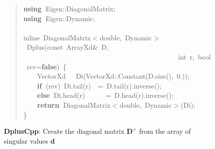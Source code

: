 \documentclass[shortnames,article]{jss}
\newcommand{\hlstd}[1]{\textcolor[rgb]{0,0,0}{#1}}
\newcommand{\hlnum}[1]{\textcolor[rgb]{0,0,0}{#1}}
\newcommand{\hlopt}[1]{\textcolor[rgb]{0,0,0}{#1}}
\newcommand{\hlkwa}[1]{\textcolor[rgb]{0.61,0.13,0.93}{\bf{#1}}}
\newcommand{\hlkwb}[1]{\textcolor[rgb]{0.13,0.54,0.13}{#1}}
\newcommand{\hlkwc}[1]{\textcolor[rgb]{0,0,1}{#1}}
\newcommand{\hlkwd}[1]{\textcolor[rgb]{0,0,0}{#1}}
\begin{document}
\begin{figure}[htb]
  \begin{quote}
    \noindent
    \ttfamily
    \hlstd{}\hlkwa{using\ }\hlstd{Eigen}\hlopt{::}\hlstd{DiagonalMatrix}\hlopt{;}\hspace*{\fill}\\
    \hlstd{}\hlkwa{using\ }\hlstd{Eigen}\hlopt{::}\hlstd{Dynamic}\hlopt{;}\hspace*{\fill}\\
    \hlstd{}\hspace*{\fill}\\
    \hlkwc{inline\ }\hlstd{DiagonalMatrix}\hlopt{$<$}\hlstd{}\hlkwb{double}\hlstd{}\hlopt{,\ }\hlstd{Dynamic}\hlopt{$>$\ }\hlstd{}\hlkwd{Dplus}\hlstd{}\hlopt{(}\hlstd{}\hlkwb{const\ }\hlstd{ArrayXd}\hlopt{\&\ }\hlstd{D}\hlopt{,}\hspace*{\fill}\\
    \hlstd{}\hlstd{\ \ \ \ \ \ \ \ \ \ \ \ \ \ \ \ \ \ \ \ \ \ \ \ \ \ \ \ \ \ \ \ \ \ \ \ \ \ \ \ \ \ \ \ \ }\hlstd{}\hlkwb{int\ }\hlstd{r}\hlopt{,\ }\hlstd{}\hlkwb{bool\ }\hlstd{rev}\hlopt{=}\hlstd{}\hlkwa{false}\hlstd{}\hlopt{)\ \{}\hspace*{\fill}\\
    \hlstd{}\hlstd{\ \ \ \ }\hlstd{VectorXd}\hlstd{\ \ \ }\hlstd{}\hlkwd{Di}\hlstd{}\hlopt{(}\hlstd{VectorXd}\hlopt{::}\hlstd{}\hlkwd{Constant}\hlstd{}\hlopt{(}\hlstd{D}\hlopt{.}\hlstd{}\hlkwd{size}\hlstd{}\hlopt{(),\ }\hlstd{}\hlnum{0}\hlstd{}\hlopt{.));}\hspace*{\fill}\\
    \hlstd{}\hlstd{\ \ \ \ }\hlstd{}\hlkwa{if\ }\hlstd{}\hlopt{(}\hlstd{rev}\hlopt{)\ }\hlstd{Di}\hlopt{.}\hlstd{}\hlkwd{tail}\hlstd{}\hlopt{(}\hlstd{r}\hlopt{)}\hlstd{\ \ }\hlopt{=\ }\hlstd{D}\hlopt{.}\hlstd{}\hlkwd{tail}\hlstd{}\hlopt{(}\hlstd{r}\hlopt{).}\hlstd{}\hlkwd{inverse}\hlstd{}\hlopt{();}\hspace*{\fill}\\
    \hlstd{}\hlstd{\ \ \ \ }\hlstd{}\hlkwa{else\ }\hlstd{Di}\hlopt{.}\hlstd{}\hlkwd{head}\hlstd{}\hlopt{(}\hlstd{r}\hlopt{)}\hlstd{\ \ \ \ \ \ }\hlopt{=\ }\hlstd{D}\hlopt{.}\hlstd{}\hlkwd{head}\hlstd{}\hlopt{(}\hlstd{r}\hlopt{).}\hlstd{}\hlkwd{inverse}\hlstd{}\hlopt{();}\hspace*{\fill}\\
    \hlstd{}\hlstd{\ \ \ \ }\hlstd{}\hlkwa{return\ }\hlstd{DiagonalMatrix}\hlopt{$<$}\hlstd{}\hlkwb{double}\hlstd{}\hlopt{,\ }\hlstd{Dynamic}\hlopt{$>$(}\hlstd{Di}\hlopt{);}\hspace*{\fill}\\
    \hlstd{}\hlopt{\}}\hlstd{}\hspace*{\fill}
    \normalfont
    \normalsize
  \end{quote}
  \caption{\textbf{DplusCpp}: Create the diagonal matrix $\bm D^+$ from the array of singular values $\bm d$}
  \label{Dplus}
\end{figure}
\end{document}

